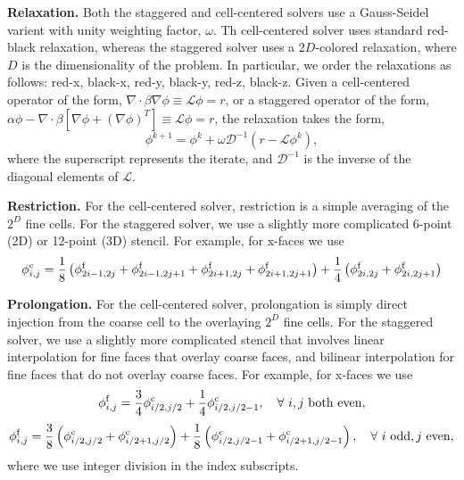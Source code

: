 \documentclass[final]{siamltex}
\begin{document}
{\bf Relaxation.}  Both the staggered and cell-centered solvers use a Gauss-Seidel
varient with unity weighting factor, $\omega$.  Th cell-centered solver uses standard red-black
relaxation, whereas the staggered solver uses a 2$D$-colored relaxation,
where $D$ is the dimensionality of the problem.  In particular, we order the relaxations
as follows: red-x, black-x, red-y, black-y, red-z, black-z.
Given a cell-centered operator of the form,
$\nabla\cdot\beta\nabla\phi \equiv \mathcal{L}\phi = r$,
or a staggered operator of the form,
$\alpha\phi - \nabla\cdot\beta[\nabla\phi + (\nabla\phi)^T] \equiv \mathcal{L} \phi = r$,
the relaxation takes the form,
\begin{equation}
\phi^{k+1} = \phi^k + \omega\mathcal{D}^{-1}(r-\mathcal{L}\phi^k),
\end{equation}
where the superscript represents the iterate, and $\mathcal{D}^{-1}$ is the inverse of the
diagonal elements of $\mathcal{L}$.

{\bf Restriction.}  For the cell-centered solver, restriction is a simple averaging of
the $2^D$ fine cells.  For the staggered solver, we use a slightly more complicated
6-point (2D) or 12-point (3D) stencil.  For example, for x-faces we use
\begin{equation}
\phi_{i,j}^{\rm c} = \frac{1}{8}\left(\phi_{2i-1,2j}^{\rm f}+\phi_{2i-1,2j+1}^{\rm f}+\phi_{2i+1,2j}^{\rm f}+\phi_{2i+1,2j+1}^{\rm f}\right) 
+ \frac{1}{4}\left(\phi_{2i,2j}^{\rm f}+\phi_{2i,2j+1}^{\rm f}\right)
\end{equation}

{\bf Prolongation.}  For the cell-centered solver, prolongation is simply direct
injection from the coarse cell to the overlaying $2^D$ fine cells.  For the
staggered solver, we use a slightly more complicated stencil that involves linear
interpolation for fine faces that overlay coarse faces, and bilinear interpolation
for fine faces that do not overlay coarse faces.  For example, for x-faces we use
\begin{equation}
\phi_{i,j}^{\rm f} = \frac{3}{4}\phi_{i/2,j/2}^{\rm c} + \frac{1}{4}\phi_{i/2,j/2-1}^{\rm c}, \quad \forall~i,j~{\rm both~even},
\end{equation}
\begin{equation}
\phi_{i,j}^{\rm f} = \frac{3}{8}\left(\phi_{i/2,j/2}^{\rm c}+\phi_{i/2+1,j/2}^{\rm c}\right) + \frac{1}{8}\left(\phi_{i/2,j/2-1}^{\rm c}+\phi_{i/2+1,j/2-1}^{\rm c}\right), \quad \forall~i~{\rm odd},j~{\rm even},
\end{equation}
where we use integer division in the index subscripts.
\end{document}
